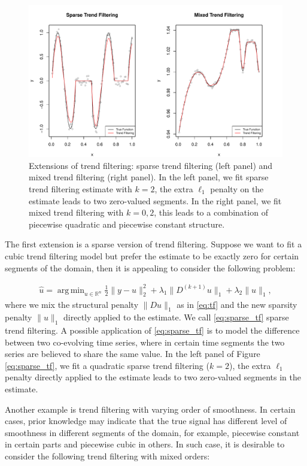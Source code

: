 \documentclass[a4paper]{article}
\DeclareMathOperator*{\argmin}{arg\,min}
\newcommand{\RR}{\mathbb{R}}
\begin{document}
\begin{figure}[t!]
\centering
\includegraphics[width = 1\textwidth]{Figures/Figure11.pdf}
\caption{Extensions of trend filtering: sparse trend filtering (left panel) and mixed trend filtering (right panel). In the left panel, we fit sparse trend filtering estimate with $k = 2$, the extra $\ell_1$ penalty on the estimate leads to two zero-valued segments. In the right panel, we fit mixed trend filtering with $k=0,2$, this leads to a combination of piecewise quadratic and piecewise constant structure.}
\label{fig:sparse_mixed_tf}
\end{figure}

The first extension is a sparse version of trend filtering. Suppose we want to fit a cubic trend filtering model but prefer the estimate to be exactly zero for certain segments of the domain, then it is appealing to consider the following problem:

\begin{align}
\hat{u} = \argmin_{u\in\RR^n}\frac{1}{2}\|y-u\|_2^2 + \lambda_1\|D^{(k+1)}u\|_1 + \lambda_2\|u\|_1,
\label{eq:sparse_tf}
\end{align}
where we mix the structural penalty $\|Du\|_1$ as in \eqref{eq:tf} and the new sparsity penalty $\|u\|_1$ directly applied to the estimate. We call \eqref{eq:sparse_tf} sparse trend filtering. A possible application of \eqref{eq:sparse_tf} is to model the difference between two co-evolving time series, where in certain time segments the two series are believed to share the same value. In the left panel of Figure \ref{eq:sparse_tf}, we fit a quadratic sparse trend filtering ($k=2$), the extra $\ell_1$ penalty directly applied to the estimate leads to two zero-valued segments in the estimate. 

Another example is trend filtering with varying order of smoothness. In certain cases, prior knowledge may indicate that the true signal has different level of smoothness in different segments of the domain, for example, piecewise constant in certain parts and piecewise cubic in others. In such case, it is desirable to consider the following trend filtering with mixed orders:
\end{document}
